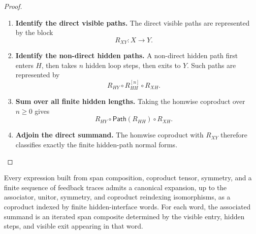 \begin{proof}
\begin{enumerate}
  \item \textbf{Identify the direct visible paths.}
  The direct visible paths are represented by the block
  \[
    R_{XY}:X\to Y.
  \]

  \item \textbf{Identify the non-direct hidden paths.}
  A non-direct hidden path first enters \(H\), then takes \(n\) hidden loop
  steps, then exits to \(Y\). Such paths are represented by
  \[
    R_{HY}\circ R_{HH}^{[n]}\circ R_{XH}.
  \]

  \item \textbf{Sum over all finite hidden lengths.}
  Taking the homwise coproduct over \(n\geq 0\) gives
  \[
    R_{HY}\circ\mathsf{Path}(R_{HH})\circ R_{XH}.
  \]

  \item \textbf{Adjoin the direct summand.}
  The homwise coproduct with \(R_{XY}\) therefore classifies exactly the
  finite hidden-path normal forms.
\end{enumerate}
\end{proof}

\begin{lemma}
\label{lem:finite-word-expansion-traced-spans}
Every expression built from span composition, coproduct tensor, symmetry, and
a finite sequence of feedback traces admits a canonical expansion, up to the
associator, unitor, symmetry, and coproduct reindexing isomorphisms, as a
coproduct indexed by finite hidden-interface words. For each word, the
associated summand is an iterated span composite determined by the visible
entry, hidden steps, and visible exit appearing in that word.
\end{lemma}

